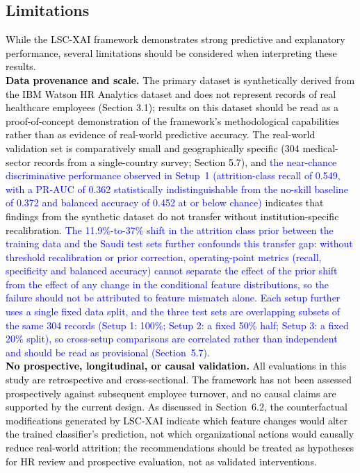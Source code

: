 \documentclass[a4paper,fleqn]{cas-sc}
\begin{document}
{\subsection{Limitations}
\label{subsec:limilations}
\textcolor{black}{
While the LSC-XAI framework demonstrates strong predictive and explanatory performance, several limitations should be considered when interpreting these results.\\
\textbf{Data provenance and scale.} The primary dataset is synthetically derived from the IBM Watson HR Analytics dataset and does not represent records of real healthcare employees (Section 3.1); results on this dataset should be read as a proof-of-concept demonstration of the framework's methodological capabilities rather than as evidence of real-world predictive accuracy. The real-world validation set is comparatively small and geographically specific (304 medical-sector records from a single-country survey; Section 5.7), and \textcolor{blue}{the near-chance discriminative performance observed in Setup~1 (attrition-class recall of 0.549, with a PR-AUC of 0.362 statistically indistinguishable from the no-skill baseline of 0.372 and balanced accuracy of 0.452 at or below chance)} indicates that findings from the synthetic dataset do not transfer without institution-specific recalibration. \textcolor{blue}{The 11.9\%-to-37\% shift in the attrition class prior between the training data and the Saudi test sets further confounds this transfer gap: without threshold recalibration or prior correction, operating-point metrics (recall, specificity and balanced accuracy) cannot separate the effect of the prior shift from the effect of any change in the conditional feature distributions, so the failure should not be attributed to feature mismatch alone.} \textcolor{blue}{Each setup further uses a single fixed data split, and the three test sets are overlapping subsets of the same 304 records (Setup 1: 100\%; Setup 2: a fixed 50\% half; Setup 3: a fixed 20\% split), so cross-setup comparisons are correlated rather than independent and should be read as provisional (Section~5.7).}\\
\textbf{No prospective, longitudinal, or causal validation.} All evaluations in this study are retrospective and cross-sectional. The framework has not been assessed prospectively against subsequent employee turnover, and no causal claims are supported by the current design. As discussed in Section~6.2, the counterfactual modifications generated by LSC-XAI indicate which feature changes would alter the trained classifier's prediction, not which organizational actions would causally reduce real-world attrition; the recommendations should be treated as hypotheses for HR review and prospective evaluation, not as validated interventions.\\
}}
\end{document}
